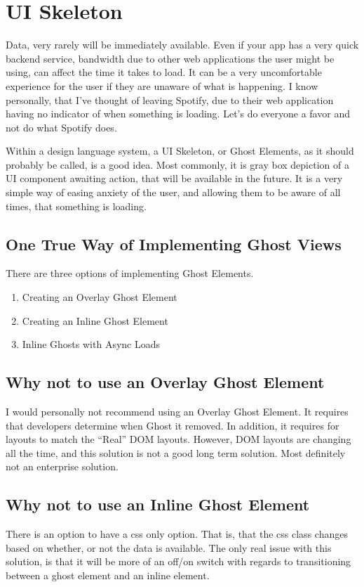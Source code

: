 \section{ UI Skeleton }


Data, very rarely will be immediately available. Even if your app has a very
quick backend service, bandwidth due to other web applications the user might
be using, can affect the time it takes to load. It can be a very uncomfortable
experience for the user if they are unaware of what is happening. I know
personally, that I've thought of leaving Spotify, due to their web application
having no indicator of when something is loading. Let's do everyone a favor
and not do what Spotify does.

Within a design language system, a UI Skeleton, or Ghost Elements, as it should
probably be called, is a good idea. Most commonly, it is gray box depiction of
a UI component awaiting action, that will be available in the future. It is a
very simple way of easing anxiety of the user, and allowing them to be aware of
all times, that something is loading.

\subsection{ One True Way of Implementing Ghost Views }
There are three options of implementing Ghost Elements.
\begin{enumerate}
  \item Creating an Overlay Ghost Element
  \item Creating an Inline Ghost Element
  \item Inline Ghosts with Async Loads
\end{enumerate}

\subsection{Why not to use an Overlay Ghost Element}
I would personally not recommend using an Overlay Ghost Element. It requires
that developers determine when Ghost it removed. In addition, it requires for
layouts to match the ``Real'' DOM layouts. However, DOM layouts are changing
all the time, and this solution is not a good long term solution. Most
definitely not an enterprise solution.

\subsection{ Why not to use an Inline Ghost Element }
There is an option to have a css only option. That is, that the css class
changes based on whether, or not the data is available. The only real issue
with this solution, is that it will be more of an off/on switch with regards
to transitioning between a ghost element and an inline element.

